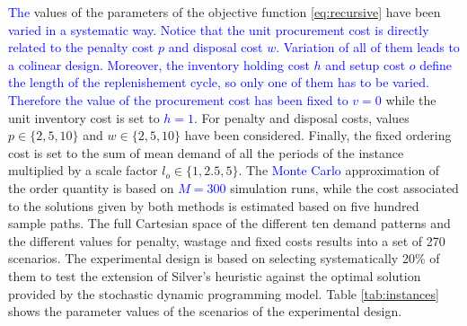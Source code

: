 \documentclass{tPRS2e}
\newcommand{\blue}{\textcolor{blue}}
\begin{document}
\blue{The} values of the parameters of the objective function \ref{eq:recursive} have been \blue{varied in a systematic way. Notice that the unit procurement cost is directly related to the penalty cost $p$ and disposal cost $w$. Variation of all of them leads to a colinear design. Moreover, the inventory holding cost $h$ and setup cost $o$ define the length of the replenishement cycle, so only one of them has to be varied. Therefore the value of the procurement cost has been fixed to $v=0$} while the unit inventory cost is set to \blue{$h=1$}. For penalty and disposal costs, values $p \in \{2,5,10\}$ and $w \in \{2,5,10\}$ have been considered. Finally, the fixed ordering cost is set to the sum of mean demand of all the periods of the instance multiplied by a scale factor $l_o \in \{1, 2.5, 5\}$. The \blue{Monte Carlo} approximation of the order quantity  is based on \blue{$M=300$} simulation runs, while the cost associated to the solutions given by both methods is estimated based on five hundred sample paths. The full Cartesian space of the different ten demand patterns and the different values for penalty, wastage and fixed costs results into a set of 270 scenarios. The experimental design is based on selecting systematically  20\% of them to test the extension of Silver's heuristic against the optimal solution provided by the stochastic dynamic programming model. Table \ref{tab:instances} shows the parameter values of the scenarios of the experimental design. 
\end{document}
